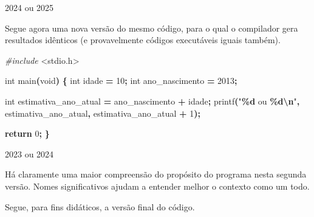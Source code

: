 \documentclass[
  11pt,
  a4paper,
]{scrbook}
\newenvironment{Shaded}{\begin{snugshade}}{\end{snugshade}}
\newcommand{\ControlFlowTok}[1]{\textcolor[rgb]{0.13,0.29,0.53}{\textbf{#1}}}
\newcommand{\DataTypeTok}[1]{\textcolor[rgb]{0.13,0.29,0.53}{#1}}
\newcommand{\DecValTok}[1]{\textcolor[rgb]{0.00,0.00,0.81}{#1}}
\newcommand{\ImportTok}[1]{#1}
\newcommand{\NormalTok}[1]{#1}
\newcommand{\OperatorTok}[1]{\textcolor[rgb]{0.81,0.36,0.00}{\textbf{#1}}}
\newcommand{\PreprocessorTok}[1]{\textcolor[rgb]{0.56,0.35,0.01}{\textit{#1}}}
\newcommand{\SpecialCharTok}[1]{\textcolor[rgb]{0.81,0.36,0.00}{\textbf{#1}}}
\newcommand{\StringTok}[1]{\textcolor[rgb]{0.31,0.60,0.02}{#1}}
\begin{document}
\begin{Shaded}
\begin{Highlighting}[]
\NormalTok{2024 ou 2025}
\end{Highlighting}
\end{Shaded}

Segue agora uma nova versão do mesmo código, para o qual o compilador
gera resultados idênticos (e provavelmente códigos executáveis iguais
também).

\begin{Shaded}
\begin{Highlighting}[]
\PreprocessorTok{\#include }\ImportTok{\textless{}stdio.h\textgreater{}}

\DataTypeTok{int}\NormalTok{ main}\OperatorTok{(}\DataTypeTok{void}\OperatorTok{)} \OperatorTok{\{}
    \DataTypeTok{int}\NormalTok{ idade }\OperatorTok{=} \DecValTok{10}\OperatorTok{;}
    \DataTypeTok{int}\NormalTok{ ano\_nascimento }\OperatorTok{=} \DecValTok{2013}\OperatorTok{;}

    \DataTypeTok{int}\NormalTok{ estimativa\_ano\_atual }\OperatorTok{=}\NormalTok{ ano\_nascimento }\OperatorTok{+}\NormalTok{ idade}\OperatorTok{;}
\NormalTok{    printf}\OperatorTok{(}\StringTok{"}\SpecialCharTok{\%d}\StringTok{ ou }\SpecialCharTok{\%d\textbackslash{}n}\StringTok{"}\OperatorTok{,}\NormalTok{ estimativa\_ano\_atual}\OperatorTok{,}\NormalTok{ estimativa\_ano\_atual }\OperatorTok{+} \DecValTok{1}\OperatorTok{);}

    \ControlFlowTok{return} \DecValTok{0}\OperatorTok{;}
\OperatorTok{\}}
\end{Highlighting}
\end{Shaded}

\begin{Shaded}
\begin{Highlighting}[]
\NormalTok{2023 ou 2024}
\end{Highlighting}
\end{Shaded}

Há claramente uma maior compreensão do propósito do programa nesta
segunda versão. Nomes significativos ajudam a entender melhor o contexto
como um todo.

Segue, para fins didáticos, a versão final do código.
\end{document}
